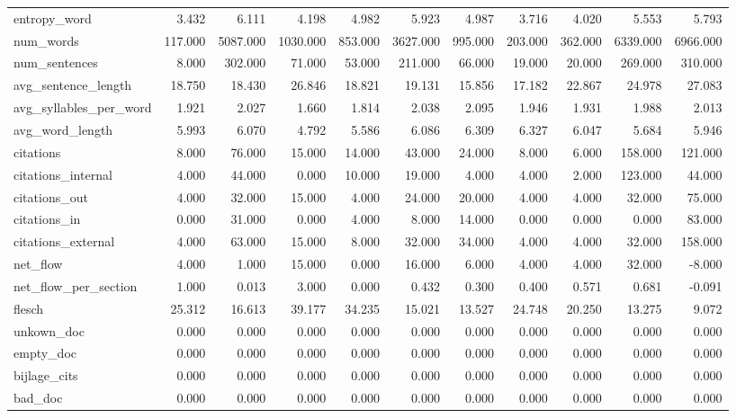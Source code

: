 \begin{tabular}{lrrrrrrrrrr}
\cline{1-11}
entropy\_word & 3.432 & 6.111 & 4.198 & 4.982 & 5.923 & 4.987 & 3.716 & 4.020 & 5.553 & 5.793 \\
\cline{1-11}
num\_words & 117.000 & 5087.000 & 1030.000 & 853.000 & 3627.000 & 995.000 & 203.000 & 362.000 & 6339.000 & 6966.000 \\
\cline{1-11}
num\_sentences & 8.000 & 302.000 & 71.000 & 53.000 & 211.000 & 66.000 & 19.000 & 20.000 & 269.000 & 310.000 \\
\cline{1-11}
avg\_sentence\_length & 18.750 & 18.430 & 26.846 & 18.821 & 19.131 & 15.856 & 17.182 & 22.867 & 24.978 & 27.083 \\
\cline{1-11}
avg\_syllables\_per\_word & 1.921 & 2.027 & 1.660 & 1.814 & 2.038 & 2.095 & 1.946 & 1.931 & 1.988 & 2.013 \\
\cline{1-11}
avg\_word\_length & 5.993 & 6.070 & 4.792 & 5.586 & 6.086 & 6.309 & 6.327 & 6.047 & 5.684 & 5.946 \\
\cline{1-11}
citations & 8.000 & 76.000 & 15.000 & 14.000 & 43.000 & 24.000 & 8.000 & 6.000 & 158.000 & 121.000 \\
\cline{1-11}
citations\_internal & 4.000 & 44.000 & 0.000 & 10.000 & 19.000 & 4.000 & 4.000 & 2.000 & 123.000 & 44.000 \\
\cline{1-11}
citations\_out & 4.000 & 32.000 & 15.000 & 4.000 & 24.000 & 20.000 & 4.000 & 4.000 & 32.000 & 75.000 \\
\cline{1-11}
citations\_in & 0.000 & 31.000 & 0.000 & 4.000 & 8.000 & 14.000 & 0.000 & 0.000 & 0.000 & 83.000 \\
\cline{1-11}
citations\_external & 4.000 & 63.000 & 15.000 & 8.000 & 32.000 & 34.000 & 4.000 & 4.000 & 32.000 & 158.000 \\
\cline{1-11}
net\_flow & 4.000 & 1.000 & 15.000 & 0.000 & 16.000 & 6.000 & 4.000 & 4.000 & 32.000 & -8.000 \\
\cline{1-11}
net\_flow\_per\_section & 1.000 & 0.013 & 3.000 & 0.000 & 0.432 & 0.300 & 0.400 & 0.571 & 0.681 & -0.091 \\
\cline{1-11}
flesch & 25.312 & 16.613 & 39.177 & 34.235 & 15.021 & 13.527 & 24.748 & 20.250 & 13.275 & 9.072 \\
\cline{1-11}
unkown\_doc & 0.000 & 0.000 & 0.000 & 0.000 & 0.000 & 0.000 & 0.000 & 0.000 & 0.000 & 0.000 \\
\cline{1-11}
empty\_doc & 0.000 & 0.000 & 0.000 & 0.000 & 0.000 & 0.000 & 0.000 & 0.000 & 0.000 & 0.000 \\
\cline{1-11}
bijlage\_cits & 0.000 & 0.000 & 0.000 & 0.000 & 0.000 & 0.000 & 0.000 & 0.000 & 0.000 & 0.000 \\
\cline{1-11}
bad\_doc & 0.000 & 0.000 & 0.000 & 0.000 & 0.000 & 0.000 & 0.000 & 0.000 & 0.000 & 0.000 \\
\cline{1-11}
\bottomrule
\end{tabular}
